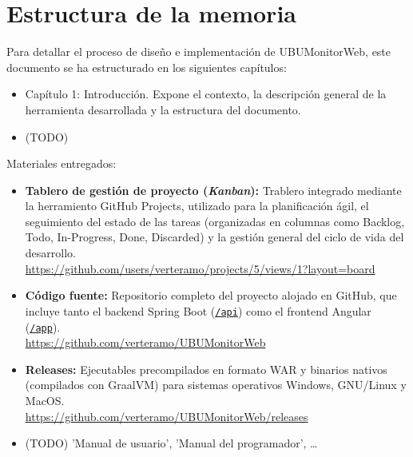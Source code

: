 \section{Estructura de la memoria}

Para detallar el proceso de diseño e implementación de UBUMonitorWeb, este documento se ha estructurado en los siguientes capítulos:

\begin{itemize}
    \item Capítulo 1: Introducción. Expone el contexto, la descripción general de la herramienta desarrollada y la estructura del documento.

    \item (TODO)
\end{itemize}


Materiales entregados:
\begin{itemize}
    \item \textbf{Tablero de gestión de proyecto (\textit{Kanban}):} Trablero integrado mediante la herramiento GitHub Projects, utilizado para la planificación ágil, el seguimiento del estado de las tareas (organizadas en columnas como Backlog, Todo, In-Progress, Done, Discarded) y la gestión general del ciclo de vida del desarrollo.\\
    \url{https://github.com/users/verteramo/projects/5/views/1?layout=board}
    
    \item \textbf{Código fuente:} Repositorio completo del proyecto alojado en GitHub, que incluye tanto el backend Spring Boot (\href{https://github.com/verteramo/UBUMonitorWeb/tree/main/api}{\texttt{/api}}) como el frontend Angular (\href{https://github.com/verteramo/UBUMonitorWeb/tree/main/app}{\texttt{/app}}).\\
    \url{https://github.com/verteramo/UBUMonitorWeb}

    \item \textbf{Releases:} Ejecutables precompilados en formato WAR y binarios nativos (compilados con GraalVM) para sistemas operativos Windows, GNU/Linux y MacOS.\\
    \url{https://github.com/verteramo/UBUMonitorWeb/releases}

    \item (TODO) 'Manual de usuario', 'Manual del programador', \dots
\end{itemize}